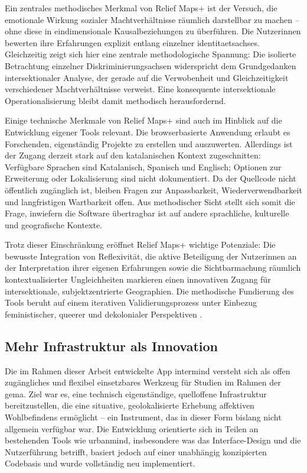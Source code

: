 Ein zentrales methodisches Merkmal von Relief Maps+ ist der Versuch, die emotionale Wirkung sozialer Machtverhältnisse räumlich darstellbar zu machen -- ohne diese in eindimensionale Kausalbeziehungen zu überführen. Die Nutzer\genderstern innen bewerten ihre Erfahrungen explizit entlang einzelner \glspl{identitaetsachse}. Gleichzeitig zeigt sich hier eine zentrale methodologische Spannung: Die isolierte Betrachtung einzelner Diskriminierungsachsen widerspricht dem Grundgedanken intersektionaler Analyse, der gerade auf die Verwobenheit und Gleichzeitigkeit verschiedener Machtverhältnisse verweist. Eine konsequente intersektionale Operationalisierung bleibt damit methodisch herausfordernd.

Einige technische Merkmale von Relief Maps+ sind auch im Hinblick auf die Entwicklung eigener Tools relevant. Die browserbasierte Anwendung erlaubt es Forschenden, eigenständig Projekte zu erstellen und auszuwerten. Allerdings ist der Zugang derzeit stark auf den katalanischen Kontext zugeschnitten: Verfügbare Sprachen sind Katalanisch, Spanisch und Englisch; Optionen zur Erweiterung oder Lokalisierung sind nicht dokumentiert. Da der Quellcode nicht öffentlich zugänglich ist, bleiben Fragen zur Anpassbarkeit, Wiederverwendbarkeit und langfristigen Wartbarkeit offen. Aus methodischer Sicht stellt sich somit die Frage, inwiefern die Software übertragbar ist auf andere sprachliche, kulturelle und geografische Kontexte.

Trotz dieser Einschränkung eröffnet Relief Maps+ wichtige Potenziale: Die bewusste Integration von Reflexivität, die aktive Beteiligung der Nutzer\genderstern innen an der Interpretation ihrer eigenen Erfahrungen sowie die Sichtbarmachung räumlich kontextualisierter Ungleichheiten markieren einen innovativen Zugang für intersektionale, subjektzentrierte Geographien. Die methodische Fundierung des Tools beruht auf einem iterativen Validierungsprozess unter Einbezug feministischer, queerer und dekolonialer Perspektiven \parencite{luizdesouzaSpiralValidationProcess2025}.



\subsection{Mehr Infrastruktur als Innovation}

Die im Rahmen dieser Arbeit entwickelte App \gls{intermind} versteht sich als offen zugängliches und flexibel einsetzbares Werkzeug für Studien im Rahmen der \acrshort{gema}. Ziel war es, eine technisch eigenständige, quelloffene Infrastruktur bereitzustellen, die eine situative, geolokalisierte Erhebung affektiven Wohlbefindens ermöglicht -- ein Instrument, das in dieser Form bislang nicht allgemein verfügbar war. Die Entwicklung orientierte sich in Teilen an bestehenden Tools wie \gls{urbanmind}, insbesondere was das Interface-Design und die Nutzerführung betrifft, basiert jedoch auf einer unabhängig konzipierten Codebasis und wurde vollständig neu implementiert.

